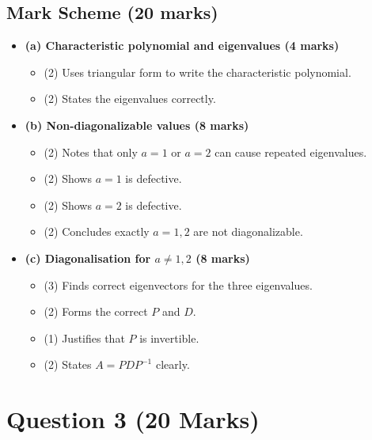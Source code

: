 \documentclass[12pt]{article}
\begin{document}
\subsection{Mark Scheme (20 marks)}
\begin{itemize}[leftmargin=1.6em]
  \item \textbf{(a) Characteristic polynomial and eigenvalues (4 marks)}
  \begin{itemize}[leftmargin=1.6em]
    \item (2) Uses triangular form to write the characteristic polynomial.
    \item (2) States the eigenvalues correctly.
  \end{itemize}
  \item \textbf{(b) Non-diagonalizable values (8 marks)}
  \begin{itemize}[leftmargin=1.6em]
    \item (2) Notes that only $a=1$ or $a=2$ can cause repeated eigenvalues.
    \item (2) Shows $a=1$ is defective.
    \item (2) Shows $a=2$ is defective.
    \item (2) Concludes exactly $a=1,2$ are not diagonalizable.
  \end{itemize}
  \item \textbf{(c) Diagonalisation for $a\neq1,2$ (8 marks)}
  \begin{itemize}[leftmargin=1.6em]
    \item (3) Finds correct eigenvectors for the three eigenvalues.
    \item (2) Forms the correct $P$ and $D$.
    \item (1) Justifies that $P$ is invertible.
    \item (2) States $A=PDP^{-1}$ clearly.
  \end{itemize}
\end{itemize}

\newpage
\section{Question 3 \hfill (20 Marks)}
\end{document}
